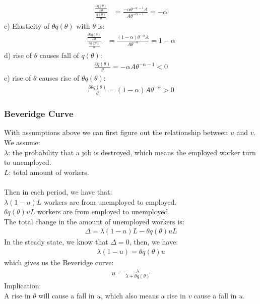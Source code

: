 \documentclass{article}
\begin{document}
\begin{align*}
	\frac{\frac{\partial q(\theta)}{\partial \theta}}{\frac{q(\theta)}{\theta}} &= \frac{-\alpha \theta^{-\alpha - 1} A}{A \theta^{-\alpha - 1}} = -\alpha
\end{align*}
\indent c) Elasticity of $\theta q(\theta)$ with $\theta$ is:
\begin{align*}
	\frac{\frac{\partial \theta q(\theta)}{\partial \theta}}{\frac{\theta q(\theta)}{\theta}} &= \frac{(1 - \alpha)\theta^{-\alpha} A}{A\theta^{-\alpha}} = 1 - \alpha
\end{align*}
\indent d) rise of $\theta$ causes fall of $q(\theta)$:
\begin{align*}
	\frac{\partial q(\theta)}{\theta} = -\alpha A \theta^{-\alpha - 1} < 0
\end{align*}
\indent e) rise of $\theta$ causes rise of $\theta q(\theta)$:
\begin{align*}
	\frac{\partial \theta q(\theta)}{\theta} = (1 - \alpha)A\theta^{-\alpha} > 0
\end{align*}

\subsubsection{Beveridge Curve}
With assumptions above we can first figure out the relationship between $u$ and $v$.\\
We assume:\\
\indent $\lambda$: the probability that a job is destroyed, which means the employed worker turn to unemployed.\\
\indent $L$: total amount of workers.\\\\
Then in each period, we have that:\\
\indent $\lambda (1 - u) L$ workers are from unemployed to employed.\\
\indent $\theta q(\theta) u L$ workers are from employed to unemployed.\\
The total change in the amount of unemployed workers is:
\begin{align*}
	\Delta = \lambda(1 - u) L - \theta q(\theta) u L
\end{align*}
In the steady state, we know that $\Delta = 0$, then, we have:
\begin{align*}
	\lambda (1 - u) = \theta q(\theta) u
\end{align*}
which gives us the Beveridge curve:
\begin{align}
	u = \frac{\lambda}{\lambda + \theta q(\theta)} \label{eq: Beveridge}
\end{align}
Implication:\\
\indent A rise in $\theta$ will cause a fall in $u$, which also means a rise in $v$ cause a fall in $u$.
\end{document}
